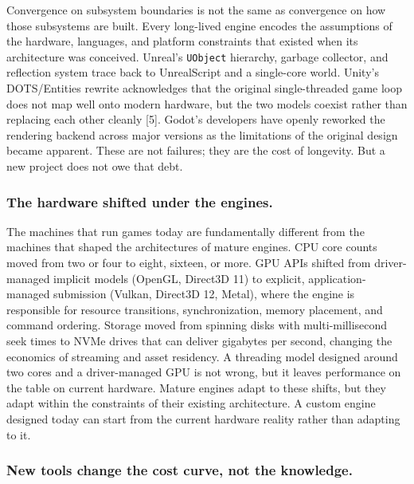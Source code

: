 \documentclass[
  11pt,
  letterpaper,
  DIV=11,
  numbers=noendperiod,
  twoside,
  open=right]{scrreprt}
\begin{document}
Convergence on subsystem boundaries is not the same as convergence on
how those subsystems are built. Every long-lived engine encodes the
assumptions of the hardware, languages, and platform constraints that
existed when its architecture was conceived. Unreal's \texttt{UObject}
hierarchy, garbage collector, and reflection system trace back to
UnrealScript and a single-core world. Unity's DOTS/Entities rewrite
acknowledges that the original single-threaded game loop does not map
well onto modern hardware, but the two models coexist rather than
replacing each other cleanly {[}5{]}. Godot's developers have openly
reworked the rendering backend across major versions as the limitations
of the original design became apparent. These are not failures; they are
the cost of longevity. But a new project does not owe that debt.

\subsubsection*{The hardware shifted under the
engines.}\label{the-hardware-shifted-under-the-engines.}

The machines that run games today are fundamentally different from the
machines that shaped the architectures of mature engines. CPU core
counts moved from two or four to eight, sixteen, or more. GPU APIs
shifted from driver-managed implicit models (OpenGL, Direct3D 11) to
explicit, application-managed submission (Vulkan, Direct3D 12, Metal),
where the engine is responsible for resource transitions,
synchronization, memory placement, and command ordering. Storage moved
from spinning disks with multi-millisecond seek times to NVMe drives
that can deliver gigabytes per second, changing the economics of
streaming and asset residency. A threading model designed around two
cores and a driver-managed GPU is not wrong, but it leaves performance
on the table on current hardware. Mature engines adapt to these shifts,
but they adapt within the constraints of their existing architecture. A
custom engine designed today can start from the current hardware reality
rather than adapting to it.

\subsubsection*{New tools change the cost curve, not the
knowledge.}\label{new-tools-change-the-cost-curve-not-the-knowledge.}
\end{document}
